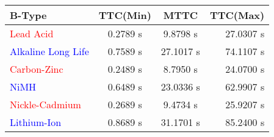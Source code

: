 		\begin{tabular}{| l | c | c | r |}
			\hline
			\textbf{B-Type} & \textbf{TTC(Min)}& \textbf{MTTC} & \textbf{TTC(Max)} \\
			\hline
			\hline
			\textcolor{red}{Lead Acid} & 0.2789 s & 9.8798 s & 27.0307 s \\
			\hline
			\textcolor{blue}{Alkaline Long Life} & 0.7589 s & 27.1017 s & 74.1107 s \\
			\hline
			\textcolor{red}{Carbon-Zinc} &  0.2489 s & 8.7950 s & 24.0700 s \\
			\hline
			\textcolor{blue}{NiMH} & 0.6489 s & 23.0336 s & 62.9907 s \\
			\hline
			\textcolor{red}{Nickle-Cadmium} & 0.2689 s & 9.4734 s & 25.9207 s \\
			\hline
			\textcolor{blue}{Lithium-Ion} & 0.8689 s & 31.1701 s & 85.2400 s \\
			\hline
		\end{tabular}